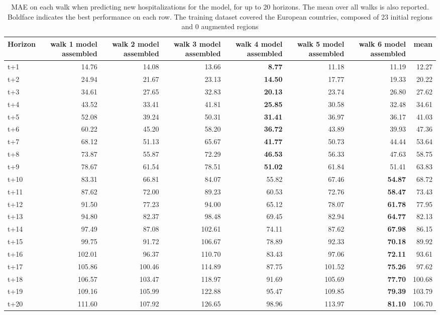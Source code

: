 \begin{table}[H]
\centering
\caption{MAE on each walk when predicting new hospitalizations for the model, for up to 20 horizons. The mean over all walks is also reported. Boldface indicates the best performance on each row. The training dataset covered the European countries, composed of 23 initial regions and 0 augmented regions }
\label{tab:MAE_walk_assembly}
\begin{tabular}{lrrrrrrr}
\toprule
Horizon &  walk 1 model assembled &  walk 2 model assembled &  walk 3 model assembled &  walk 4 model assembled &  walk 5 model assembled &  walk 6 model assembled &   mean \\
\midrule
t+1  & 14.76  & 14.08  & 13.66  & \textbf{8.77}  & 11.18  & 11.19  & 12.27  \\
t+2  & 24.94  & 21.67  & 23.13  & \textbf{14.50}  & 17.77  & 19.33  & 20.22  \\
t+3  & 34.61  & 27.65  & 32.83  & \textbf{20.13}  & 23.74  & 26.80  & 27.62  \\
t+4  & 43.52  & 33.41  & 41.81  & \textbf{25.85}  & 30.58  & 32.48  & 34.61  \\
t+5  & 52.08  & 39.24  & 50.31  & \textbf{31.41}  & 36.97  & 36.17  & 41.03  \\
t+6  & 60.22  & 45.20  & 58.20  & \textbf{36.72}  & 43.89  & 39.93  & 47.36  \\
t+7  & 68.12  & 51.13  & 65.67  & \textbf{41.77}  & 50.73  & 44.44  & 53.64  \\
t+8  & 73.87  & 55.87  & 72.29  & \textbf{46.53}  & 56.33  & 47.63  & 58.75  \\
t+9  & 78.67  & 61.54  & 78.51  & \textbf{51.02}  & 61.84  & 51.41  & 63.83  \\
t+10  & 83.31  & 66.81  & 84.07  & 55.82  & 67.46  & \textbf{54.87}  & 68.72  \\
t+11  & 87.62  & 72.00  & 89.23  & 60.53  & 72.76  & \textbf{58.47}  & 73.43  \\
t+12  & 91.50  & 77.23  & 94.00  & 65.12  & 78.07  & \textbf{61.78}  & 77.95  \\
t+13  & 94.80  & 82.37  & 98.48  & 69.45  & 82.94  & \textbf{64.77}  & 82.13  \\
t+14  & 97.49  & 87.08  & 102.61  & 74.11  & 87.62  & \textbf{67.98}  & 86.15  \\
t+15  & 99.75  & 91.72  & 106.67  & 78.89  & 92.33  & \textbf{70.18}  & 89.92  \\
t+16  & 102.01  & 96.37  & 110.70  & 83.43  & 97.06  & \textbf{72.11}  & 93.61  \\
t+17  & 105.86  & 100.46  & 114.89  & 87.75  & 101.52  & \textbf{75.26}  & 97.62  \\
t+18  & 106.57  & 103.47  & 118.97  & 91.69  & 105.69  & \textbf{77.70}  & 100.68  \\
t+19  & 109.16  & 105.99  & 122.88  & 95.47  & 109.85  & \textbf{79.39}  & 103.79  \\
t+20  & 111.60  & 107.92  & 126.65  & 98.96  & 113.97  & \textbf{81.10}  & 106.70  \\

\bottomrule
\end{tabular}
\end{table}
